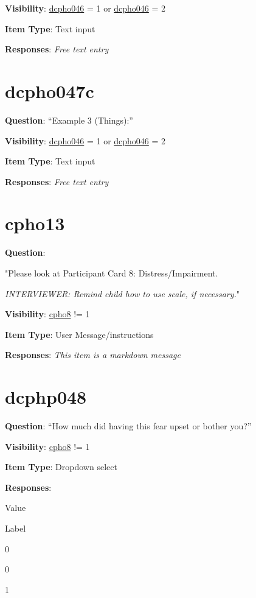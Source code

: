 \documentclass[]{book}
\begin{document}
\textbf{Visibility}: \protect\hyperlink{dcpho046}{dcpho046} = 1 or \protect\hyperlink{dcpho046}{dcpho046} = 2

\textbf{Item Type}: Text input

\textbf{Responses}: \emph{Free text entry}

\hypertarget{dcpho047c}{%
\section{dcpho047c}\label{dcpho047c}}

\textbf{Question}: ``Example 3 (Things):''

\textbf{Visibility}: \protect\hyperlink{dcpho046}{dcpho046} = 1 or \protect\hyperlink{dcpho046}{dcpho046} = 2

\textbf{Item Type}: Text input

\textbf{Responses}: \emph{Free text entry}

\hypertarget{cpho13}{%
\section{cpho13}\label{cpho13}}

\textbf{Question}:

"Please look at Participant Card 8: Distress/Impairment.

\emph{INTERVIEWER: Remind child how to use scale, if necessary.}"

\textbf{Visibility}: \protect\hyperlink{cpho8}{cpho8} != 1

\textbf{Item Type}: User Message/instructions

\textbf{Responses}: \emph{This item is a markdown message}

\hypertarget{dcphp048}{%
\section{dcphp048}\label{dcphp048}}

\textbf{Question}: ``How much did having this fear upset or bother you?''

\textbf{Visibility}: \protect\hyperlink{cpho8}{cpho8} != 1

\textbf{Item Type}: Dropdown select

\textbf{Responses}:

Value

Label

0

0

1
\end{document}
